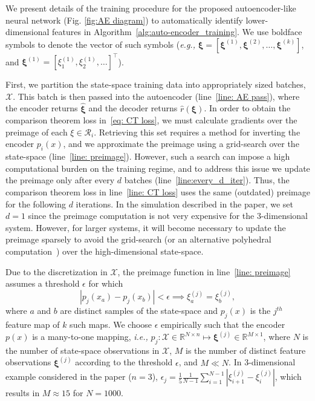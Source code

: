 \documentclass[letterpaper]{article} %
\newcommand{\todo}[1]{\textcolor{blue}{[TODO: #1]}}
\newcommand{\ie}{\textit{i.e., }}
\newcommand{\eg}{\textit{e.g., }}
\begin{document}

We present details of the training procedure for the proposed autoencoder-like neural network (Fig. \ref{fig:AE diagram}) to automatically identify lower-dimensional features in Algorithm~\ref{alg:auto-encoder_training}. We use boldface symbols to denote the vector of such symbols (\eg $\boldsymbol\xi = [\boldsymbol\xi^{(1)}, \boldsymbol\xi^{(2)}, \ldots, \boldsymbol\xi^{(k)}]$, and $\boldsymbol\xi^{(1)}=[\xi_1^{(1)}, \xi_2^{(1)}, \ldots]^\top$). 

First, we partition the state-space training data into appropriately sized batches, $\mathcal{X}$. This batch is then passed into the autoencoder (line~\ref{line: AE pass}), where the encoder returns $\hat{\boldsymbol\xi}$ and the decoder returns $\hat{r}(\boldsymbol\xi)$. In order to obtain the comparison theorem loss in~\eqref{eq: CT loss}, we must calculate gradients over the preimage of each $\xi\in\mathcal{R}_i$.
Retrieving this set requires a method for inverting the encoder $p_i(x)$, and we approximate the preimage using a grid-search over the state-space (line~\ref{line: preimage}).
However, such a search can impose a high computational burden on the training regime, and to address this issue we update the preimage only after every $d$ batches (line~\ref{line:every_d_iter}). 
Thus, the comparison theorem loss in line~\ref{line: CT loss} uses the same (outdated) preimage for the following $d$ iterations. In the simulation described in the paper, we set $d=1$ since the preimage computation is not very expensive for the 3-dimensional system. However, for larger systems, it will become necessary to update the preimage sparsely to avoid the grid-search (or an alternative polyhedral computation~\cite{polyhedral}) over the high-dimensional state-space. 

Due to the discretization in $\mathcal{X}$, the preimage function in line~\ref{line: preimage} assumes a threshold $\epsilon$ for which 
$$|p_j(x_a) - p_j(x_b)|<\epsilon\implies \xi_a^{(j)}=\xi_b^{(j)},$$
where $a$ and $b$ are distinct samples of the state-space and $p_j(x)$ is the $j^{th}$ feature map of $k$ such maps. We choose $\epsilon$ empirically such that the encoder $p(x)$ is a many-to-one mapping, \ie $p_j: \mathcal{X}\in\mathbb{R}^{N\times n}\mapsto\boldsymbol\xi^{(j)}\in\mathbb{R}^{M\times 1}$, where $N$ is the number of state-space observations in $\mathcal{X}$, $M$ is the number of distinct feature observations $\boldsymbol{\xi}^{(j)}$ according to the threshold $\epsilon$, and $M\ll N$. In 3-dimensional example considered in the paper ($n=3$), $\epsilon_j=\frac{1}{5}\frac{1}{N-1}\sum_{i=1}^{N-1}|\xi_{i+1}^{(j)}-\xi_i^{(j)}|$, which results in $M\approx 15$ for $N=1000$.
\end{document}

